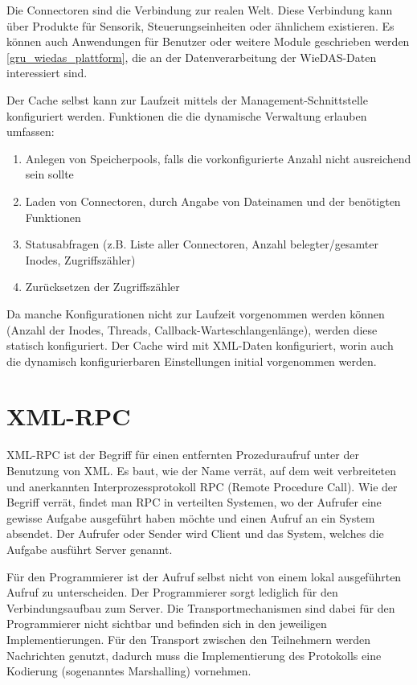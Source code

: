 Die Connectoren sind die Verbindung zur realen Welt.
Diese Verbindung kann über Produkte für Sensorik, Steuerungseinheiten oder ähnlichem existieren.
Es können auch Anwendungen für Benutzer oder weitere Module geschrieben werden \ref{gru_wiedas_plattform},
die an der Datenverarbeitung der WieDAS-Daten interessiert sind.

Der Cache selbst kann zur Laufzeit mittels der Management-Schnittstelle konfiguriert werden.
Funktionen die die dynamische Verwaltung erlauben umfassen:
\begin{enumerate}
\item Anlegen von Speicherpools, falls die vorkonfigurierte Anzahl nicht ausreichend sein sollte
\item Laden von Connectoren, durch Angabe von Dateinamen und der benötigten Funktionen
\item Statusabfragen (z.B. Liste aller Connectoren, Anzahl belegter/gesamter Inodes, Zugriffszähler)
\item Zurücksetzen der Zugriffszähler
\end{enumerate}
Da manche Konfigurationen nicht zur Laufzeit vorgenommen werden können (Anzahl der Inodes, Threads,
Callback-Warteschlangenlänge), werden diese statisch konfiguriert.
Der Cache wird mit XML-Daten konfiguriert, worin auch die dynamisch konfigurierbaren Einstellungen
initial vorgenommen werden.

\section{XML-RPC}
\label{gru_xmlrpc}

XML-RPC ist der Begriff für einen entfernten Prozeduraufruf unter der Benutzung von XML.
Es baut, wie der Name verrät, auf dem weit verbreiteten und anerkannten Interprozessprotokoll RPC
(Remote Procedure Call).
Wie der Begriff verrät, findet man RPC in verteilten Systemen, wo der Aufrufer eine gewisse
Aufgabe ausgeführt haben möchte und einen Aufruf an ein System absendet.
Der Aufrufer oder Sender wird Client und das System, welches die Aufgabe ausführt Server genannt.

Für den Programmierer ist der Aufruf selbst nicht von einem lokal ausgeführten Aufruf zu unterscheiden.
Der Programmierer sorgt lediglich für den Verbindungsaufbau zum Server.
Die Transportmechanismen sind dabei für den Programmierer nicht sichtbar und befinden sich in den jeweiligen
Implementierungen.
Für den Transport zwischen den Teilnehmern werden Nachrichten genutzt, dadurch muss die Implementierung
des Protokolls eine Kodierung (sogenanntes Marshalling) vornehmen.

